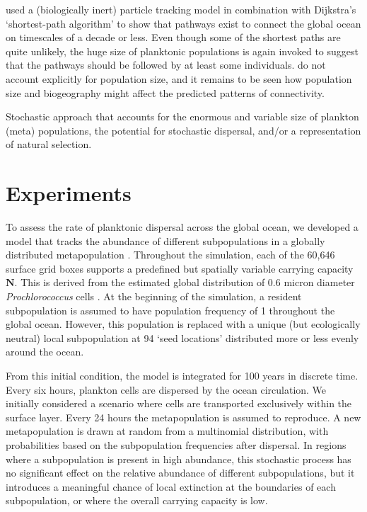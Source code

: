 \documentclass[12pt]{article}
\begin{document}
\citet{Jonsson:2016} used a (biologically inert) particle tracking model in combination with Dijkstra's `shortest-path algorithm' \citet[][]{Dijkstra:1959} to show that pathways exist to connect the global ocean on timescales of a decade or less. Even though some of the shortest paths are quite unlikely, the huge size of planktonic populations is again invoked to suggest that the pathways should be followed by at least some individuals.  \citet{Jonsson:2016} do not account explicitly for population size, and it remains to be seen how population size and biogeography might affect the predicted patterns of connectivity.


Stochastic approach that accounts for the enormous and variable size of plankton (meta) populations, the potential for stochastic dispersal, and/or a representation of natural selection.

\section{Experiments}

To assess the rate of planktonic dispersal across the global ocean, we developed a model that tracks the abundance of different subpopulations in a globally distributed metapopulation \citep{Cherry:2003}. Throughout the simulation, each of the 60,646 surface grid boxes supports a predefined but spatially variable carrying capacity $\mathbf{N}$. This is derived from the estimated global distribution of 0.6 micron diameter \textit{Prochlorococcus} cells \citep{}. At the beginning of the simulation, a resident subpopulation is assumed to have population frequency of 1 throughout the global ocean. However, this population is replaced with a unique (but ecologically neutral) local subpopulation at 94 `seed locations' distributed more or less evenly around the ocean. 

From this initial condition, the model is integrated for 100 years in discrete time. Every six hours, plankton cells are dispersed by the ocean circulation. We initially considered a scenario where cells are transported exclusively within the surface layer. Every 24 hours the metapopulation is assumed to reproduce. A new metapopulation is drawn at random from a multinomial distribution, with probabilities based on the subpopulation frequencies after dispersal. In regions where a subpopulation is present in high abundance, this stochastic process has no significant effect on the relative abundance of different subpopulations, but it introduces a meaningful chance of local extinction at the boundaries of each subpopulation, or where the overall carrying capacity is low. 
\end{document}

